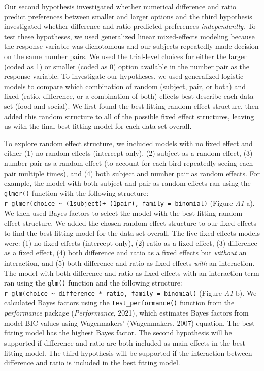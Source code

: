 \documentclass[
  ,doc,floatsintext]{apa6}
\begin{document}
Our second hypothesis investigated whether numerical difference and ratio predict preferences between smaller and larger options and the third hypothesis investigated whether difference and ratio predicted preferences \emph{independently}. To test these hypotheses, we used generalized linear mixed-effects modeling because the response variable was dichotomous and our subjects repeatedly made decision on the same number pairs. We used the trial-level choices for either the larger (coded as 1) or smaller (coded as 0) option available in the number pair as the response variable. To investigate our hypotheses, we used generalized logistic models to compare which combination of random (subject, pair, or both) and fixed (ratio, difference, or a combination of both) effects best describe each data set (food and social). We first found the best-fitting random effect structure, then added this random structure to all of the possible fixed effect structures, leaving us with the final best fitting model for each data set overall.

To explore random effect structure, we included models with no fixed effect and either (1) no random effects (intercept only), (2) subject as a random effect, (3) number pair as a random effect (to account for each bird repeatedly seeing each pair multiple times), and (4) both subject and number pair as random effects. For example, the model with both subject and pair as random effects ran using the \texttt{glmer()} function with the following structure: \texttt{r\ glmer(choice\ \textasciitilde{}\ (1\textbar{}subject)+\ (1\textbar{}pair),\ family\ =\ binomial)} (Figure \emph{A1} a). We then used Bayes factors to select the model with the best-fitting random effect structure. We added the chosen random effect structure to our fixed effects to find the best-fitting model for the data set overall. The five fixed effects models were: (1) no fixed effects (intercept only), (2) ratio as a fixed effect, (3) difference as a fixed effect, (4) both difference and ratio as a fixed effects but \emph{without} an interaction, and (5) both difference and ratio as fixed effects \emph{with} an interaction. The model with both difference and ratio as fixed effects with an interaction term ran using the \texttt{glm()} function and the following structure: \texttt{r\ glm(choice\ \textasciitilde{}\ difference\ *\ ratio,\ family\ =\ binomial)} (Figure \emph{A1} b). We calculated Bayes factors using the \texttt{test\_performance()} function from the \emph{performance} package (\emph{Performance}, 2021), which estimates Bayes factors from model BIC values using Wagenmakers' (Wagenmakers, 2007) equation. The best fitting model has the highest Bayes factor. The second hypothesis will be supported if difference and ratio are both included as main effects in the best fitting model. The third hypothesis will be supported if the interaction between difference and ratio is included in the best fitting model.
\end{document}
